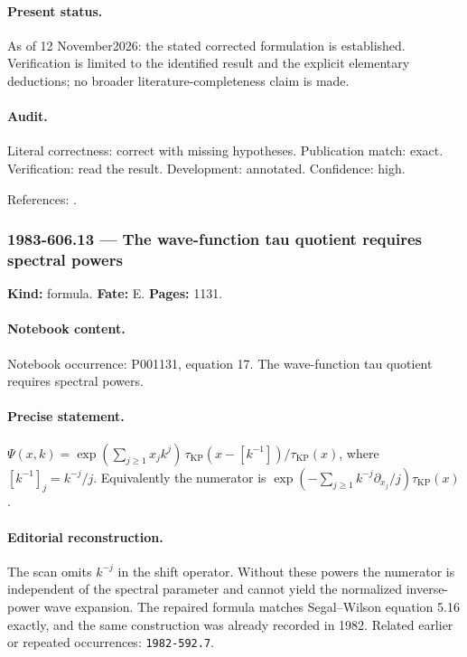 \paragraph{Present status.} As of 12 November2026: the stated corrected formulation is established. Verification is limited to the identified result and the explicit elementary deductions; no broader literature-completeness claim is made.

\paragraph{Audit.} Literal correctness: correct with missing hypotheses. Publication match: exact. Verification: read the result. Development: annotated. Confidence: high.

\noindent References: \citep{segalwilson1985loop}.\par

\subsubsection{1983-606.13 --- The wave-function tau quotient requires spectral powers}

\label{item:1983-606.13}

\noindent\textbf{Kind:} formula. \textbf{Fate:} E. \textbf{Pages:} 1131.\par

\paragraph{Notebook content.} Notebook occurrence: P001131, equation 17. The wave-function tau quotient requires spectral powers.

\paragraph{Precise statement.} \(\Psi(x,k)=\exp(\sum_{j\ge1}x_jk^j)\,\tau_{\mathrm{KP}}(x-[k^{-1}])/\tau_{\mathrm{KP}}(x)\), where \([k^{-1}]_j=k^{-j}/j\). Equivalently the numerator is \(\exp(-\sum_{j\ge1}k^{-j}\partial_{x_j}/j)\tau_{\mathrm{KP}}(x)\).

\paragraph{Editorial reconstruction.} The scan omits \(k^{-j}\) in the shift operator. Without these powers the numerator is independent of the spectral parameter and cannot yield the normalized inverse-power wave expansion. The repaired formula matches Segal--Wilson equation 5.16 exactly, and the same construction was already recorded in 1982. Related earlier or repeated occurrences: \texttt{1982-592.7}.

